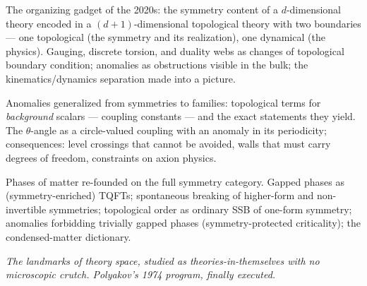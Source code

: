 The organizing gadget of the 2020s: the symmetry content of a $d$-dimensional theory encoded in a $(d{+}1)$-dimensional topological theory with two boundaries --- one topological (the symmetry and its realization), one dynamical (the physics). Gauging, discrete torsion, and duality webs as changes of topological boundary condition; anomalies as obstructions visible in the bulk; the kinematics/dynamics separation made into a picture.

Anomalies generalized from symmetries to families: topological terms for \emph{background} scalars --- coupling constants --- and the exact statements they yield. The $\theta$-angle as a circle-valued coupling with an anomaly in its periodicity; consequences: level crossings that cannot be avoided, walls that must carry degrees of freedom, constraints on axion physics.

Phases of matter re-founded on the full symmetry category. Gapped phases as (symmetry-enriched) TQFTs; spontaneous breaking of higher-form and non-invertible symmetries; topological order as ordinary SSB of one-form symmetry; anomalies forbidding trivially gapped phases (symmetry-protected criticality); the condensed-matter dictionary.


\noin \emph{The landmarks of theory space, studied as theories-in-themselves with no microscopic crutch. Polyakov's 1974 program, finally executed.}


